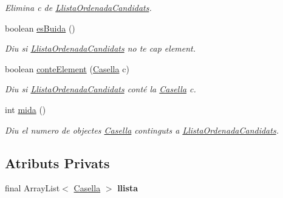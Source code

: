 \begin{DoxyCompactItemize}
\begin{DoxyCompactList}\small\item\em Elimina c de \hyperlink{classlogica_1_1algoritmica_1_1_llista_ordenada_candidats}{Llista\+Ordenada\+Candidats}. \end{DoxyCompactList}\item 
boolean \hyperlink{classlogica_1_1algoritmica_1_1_llista_ordenada_candidats_ac65c7847f389c4a729256d6f56250c32}{es\+Buida} ()
\begin{DoxyCompactList}\small\item\em Diu si \hyperlink{classlogica_1_1algoritmica_1_1_llista_ordenada_candidats}{Llista\+Ordenada\+Candidats} no te cap element. \end{DoxyCompactList}\item 
boolean \hyperlink{classlogica_1_1algoritmica_1_1_llista_ordenada_candidats_a211e94e69348c4e3c6a5a64991ee4364}{conte\+Element} (\hyperlink{classlogica_1_1algoritmica_1_1_casella}{Casella} c)
\begin{DoxyCompactList}\small\item\em Diu si \hyperlink{classlogica_1_1algoritmica_1_1_llista_ordenada_candidats}{Llista\+Ordenada\+Candidats} conté la \hyperlink{classlogica_1_1algoritmica_1_1_casella}{Casella} c. \end{DoxyCompactList}\item 
int \hyperlink{classlogica_1_1algoritmica_1_1_llista_ordenada_candidats_aa9b91dbc941f9693f2f896a4088a63d4}{mida} ()
\begin{DoxyCompactList}\small\item\em Diu el numero de objectes \hyperlink{classlogica_1_1algoritmica_1_1_casella}{Casella} continguts a \hyperlink{classlogica_1_1algoritmica_1_1_llista_ordenada_candidats}{Llista\+Ordenada\+Candidats}. \end{DoxyCompactList}\end{DoxyCompactItemize}
\subsection*{Atributs Privats}
\begin{DoxyCompactItemize}
\item 
\hypertarget{classlogica_1_1algoritmica_1_1_llista_ordenada_candidats_a091af444ca6a099a769acb5f5286c9df}{final Array\+List$<$ \hyperlink{classlogica_1_1algoritmica_1_1_casella}{Casella} $>$ {\bfseries llista}}\label{classlogica_1_1algoritmica_1_1_llista_ordenada_candidats_a091af444ca6a099a769acb5f5286c9df}

\end{DoxyCompactItemize}


